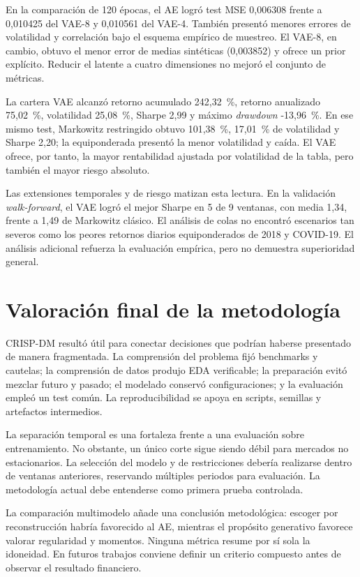 En la comparación de 120 épocas, el AE logró test MSE 0,006308 frente a 0,010425 del VAE-8 y 0,010561 del VAE-4. También presentó menores errores de volatilidad y correlación bajo el esquema empírico de muestreo. El VAE-8, en cambio, obtuvo el menor error de medias sintéticas (0,003852) y ofrece un prior explícito. Reducir el latente a cuatro dimensiones no mejoró el conjunto de métricas.

La cartera VAE alcanzó retorno acumulado 242,32~\%, retorno anualizado 75,02~\%, volatilidad 25,08~\%, Sharpe 2,99 y máximo \textit{drawdown} -13,96~\%. En ese mismo test, Markowitz restringido obtuvo 101,38~\%, 17,01~\% de volatilidad y Sharpe 2,20; la equiponderada presentó la menor volatilidad y caída. El VAE ofrece, por tanto, la mayor rentabilidad ajustada por volatilidad de la tabla, pero también el mayor riesgo absoluto.

Las extensiones temporales y de riesgo matizan esta lectura. En la validación \textit{walk-forward}, el VAE logró el mejor Sharpe en 5 de 9 ventanas, con media 1,34, frente a 1,49 de Markowitz clásico. El análisis de colas no encontró escenarios tan severos como los peores retornos diarios equiponderados de 2018 y COVID-19. El análisis adicional refuerza la evaluación empírica, pero no demuestra superioridad general.

\section{Valoración final de la metodología}

CRISP-DM resultó útil para conectar decisiones que podrían haberse presentado de manera fragmentada. La comprensión del problema fijó benchmarks y cautelas; la comprensión de datos produjo EDA verificable; la preparación evitó mezclar futuro y pasado; el modelado conservó configuraciones; y la evaluación empleó un test común. La reproducibilidad se apoya en scripts, semillas y artefactos intermedios.

La separación temporal es una fortaleza frente a una evaluación sobre entrenamiento. No obstante, un único corte sigue siendo débil para mercados no estacionarios. La selección del modelo y de restricciones debería realizarse dentro de ventanas anteriores, reservando múltiples periodos para evaluación. La metodología actual debe entenderse como primera prueba controlada.

La comparación multimodelo añade una conclusión metodológica: escoger por reconstrucción habría favorecido al AE, mientras el propósito generativo favorece valorar regularidad y momentos. Ninguna métrica resume por sí sola la idoneidad. En futuros trabajos conviene definir un criterio compuesto antes de observar el resultado financiero.

